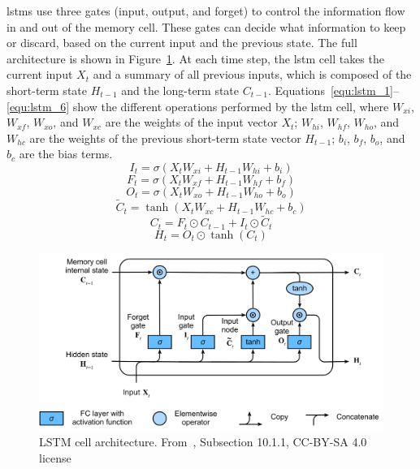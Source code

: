 \acrshort{lstm}s use three gates (input, output, and forget) to control the information flow in and out of the memory cell. These gates can decide what information to keep or discard, based on the current input and the previous state. The full architecture is shown in Figure~\ref{fig:lstm_architecture}. At each time step, the \acrshort{lstm} cell takes the current input $X_t$ and a summary of all previous inputs, which is composed of the short-term state $H_{t-1}$ and the long-term state $C_{t-1}$. Equations~\eqref{equ:lstm_1}--\eqref{equ:lstm_6} show the different operations performed by the \acrshort{lstm} cell, where $W_{xi}$, $W_{xf}$, $W_{xo}$, and $W_{xc}$ are the weights of the input vector $X_t$; $W_{hi}$, $W_{hf}$, $W_{ho}$, and $W_{hc}$ are the weights of the previous short-term state vector $H_{t-1}$; $b_i$, $b_f$, $b_o$, and $b_c$ are the bias terms.
\begin{equation}\label{equ:lstm_1}
  I_t = \sigma(X_{t}W_{xi} + H_{t-1}W_{hi} + b_{i})
\end{equation}
\begin{equation}\label{equ:lstm_2}
  F_t = \sigma(X_{t}W_{xf} + H_{t-1}W_{hf} + b_{f})
\end{equation}
\begin{equation}\label{equ:lstm_4}
  O_t = \sigma(X_{t}W_{xo} + H_{t-1}W_{ho} + b_{o})
\end{equation}
\begin{equation}\label{equ:lstm_3}
  \tilde{C}_t = \tanh(X_{t}W_{xc} + H_{t-1}W_{hc} + b_{c})
\end{equation}
\begin{equation}\label{equ:lstm_5}
  C_t = F_t \odot C_{t-1} + I_t \odot \tilde{C}_t
\end{equation}
\begin{equation}\label{equ:lstm_6}
  H_t = O_t \odot \tanh(C_t)
\end{equation}

\begin{figure}
  \centering
  \includegraphics[width=.8\linewidth]{images/modes_clustering/lstm.png}
  \caption[LSTM cell architecture]{LSTM cell architecture. From~\textcite{zhangDiveDeepLearning2023}, Subsection 10.1.1, CC-BY-SA 4.0 license}
  \label{fig:lstm_architecture}
\end{figure}

